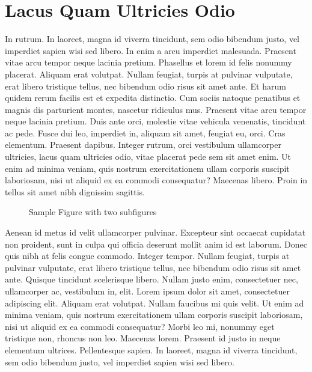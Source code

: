 \section{Lacus Quam Ultricies Odio}
In rutrum. In laoreet, magna id viverra tincidunt, sem odio bibendum justo, vel imperdiet sapien wisi sed libero. In enim a arcu imperdiet malesuada. Praesent vitae arcu tempor neque lacinia pretium. Phasellus et lorem id felis nonummy placerat. Aliquam erat volutpat. Nullam feugiat, turpis at pulvinar vulputate, erat libero tristique tellus, nec bibendum odio risus sit amet ante. Et harum quidem rerum facilis est et expedita distinctio. Cum sociis natoque penatibus et magnis dis parturient montes, nascetur ridiculus mus. Praesent vitae arcu tempor neque lacinia pretium. Duis ante orci, molestie vitae vehicula venenatis, tincidunt ac pede. Fusce dui leo, imperdiet in, aliquam sit amet, feugiat eu, orci. Cras elementum. Praesent dapibus. Integer rutrum, orci vestibulum ullamcorper ultricies, lacus quam ultricies odio, vitae placerat pede sem sit amet enim. Ut enim ad minima veniam, quis nostrum exercitationem ullam corporis suscipit laboriosam, nisi ut aliquid ex ea commodi consequatur? Maecenas libero. Proin in tellus sit amet nibh dignissim sagittis.

\begin{figure}
	\centering
	\hspace{3em} %
	\caption{Sample Figure with two subfigures}
	\label{fig:TopLevelFigureLabel}
\end{figure}

Aenean id metus id velit ullamcorper pulvinar. Excepteur sint occaecat cupidatat non proident, sunt in culpa qui officia deserunt mollit anim id est laborum. Donec quis nibh at felis congue commodo. Integer tempor. Nullam feugiat, turpis at pulvinar vulputate, erat libero tristique tellus, nec bibendum odio risus sit amet ante. Quisque tincidunt scelerisque libero. Nullam justo enim, consectetuer nec, ullamcorper ac, vestibulum in, elit. Lorem ipsum dolor sit amet, consectetuer adipiscing elit. Aliquam erat volutpat. Nullam faucibus mi quis velit. Ut enim ad minima veniam, quis nostrum exercitationem ullam corporis suscipit laboriosam, nisi ut aliquid ex ea commodi consequatur? Morbi leo mi, nonummy eget tristique non, rhoncus non leo. Maecenas lorem. Praesent id justo in neque elementum ultrices. Pellentesque sapien. In laoreet, magna id viverra tincidunt, sem odio bibendum justo, vel imperdiet sapien wisi sed libero.

